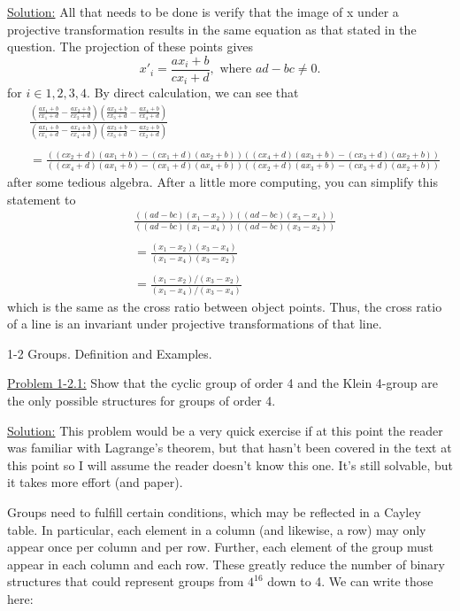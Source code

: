 \documentclass[12pt]{article}
\begin{document}
\underline{Solution:} All that needs to be done is verify that the image of x
under a projective transformation results in the same equation as that stated
in the question. The projection of these points gives
\[
    x'_i = \frac{ax_i+b}{cx_i+d}, \text{ where } ad-bc \neq 0.
\]
for $i \in {1,2,3,4}$. By direct calculation, we can see that
\begin{align*}
    & \frac{\left(\frac{ax_1 + b}{cx_1 + d} - \frac{ax_2 + b}{cx_2 + d}\right)
    \left( \frac{ax_3 + b}{cx_3 + d} - \frac{ax_4 + b}{cx_4 + d}\right)}
    {\left(\frac{ax_1 + b}{cx_1 + d} - \frac{ax_4 + b}{cx_4 + d}\right)    
    \left( \frac{ax_3 + b}{cx_3 + d} - \frac{ax_2 + b}{cx_2 + d}\right)}\\
    \\
    &=
    \frac{((cx_2+d)(ax_1+b)-(cx_1+d)(ax_2+b))((cx_4+d)(ax_3+b)-(cx_3+d)(ax_2+b))}
      {((cx_4+d)(ax_1+b)-(cx_1+d)(ax_4+b))((cx_2+d)(ax_3+b)-(cx_3+d)(ax_2+b))}
\end{align*}
after some tedious algebra. After a little more computing, you can simplify
this statement to
\begin{align*}
    & \frac{((ad-bc)(x_1-x_2))((ad-bc)(x_3-x_4))}{((ad-bc)(x_1-x_4))((ad-bc)(x_3-x_2))}\\
    \\
    & = \frac{(x_1 - x_2)(x_3 - x_4)}{(x_1-x_4)(x_3-x_2)}\\
    \\
    & = \frac{(x_1 - x_2)/(x_3 - x_2)}{(x_1-x_4)/(x_3-x_4)}
\end{align*}
which is the same as the cross ratio between object points. Thus, the cross
ratio of a line is an invariant under projective transformations of that line.

1-2 Groups. Definition and Examples.

\underline{Problem 1-2.1:} Show that the cyclic group of order 4 and the Klein
4-group are the only possible structures for groups of order 4.

\underline{Solution:} This problem would be a very quick exercise if at this
point the reader was familiar with Lagrange's theorem, but that hasn't been
covered in the text at this point so I will assume the reader doesn't know this
one. It's still solvable, but it takes more effort (and paper).

Groups need to fulfill certain conditions, which may be reflected in a Cayley
table. In particular, each element in a column (and likewise, a row) may only
appear once per column and per row. Further, each element of the group must
appear in each column and each row. These greatly reduce the number of binary
structures that could represent groups from $4^{16}$ down to 4. We can write
those here:
\end{document}
